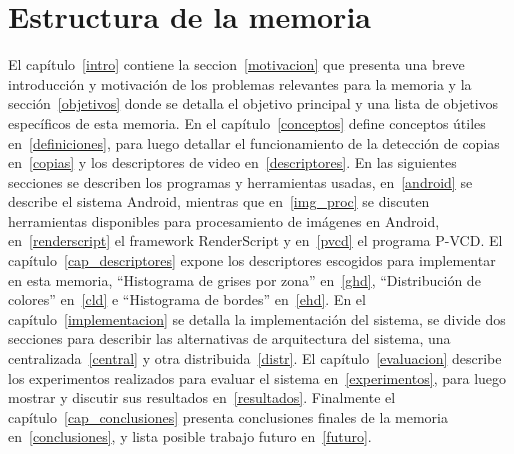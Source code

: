 \section{Estructura de la memoria}
El capítulo~\ref{intro} contiene la seccion~\ref{motivacion} que presenta una breve introducción y motivación de los problemas relevantes para la memoria y la sección~\ref{objetivos} donde se detalla el objetivo principal y una lista de objetivos específicos de esta memoria. En el capítulo~\ref{conceptos} define conceptos útiles en~\ref{definiciones}, para luego detallar el funcionamiento de la detección de copias en~\ref{copias} y los descriptores de video en~\ref{descriptores}. En las siguientes secciones se describen los programas y herramientas usadas, en~\ref{android} se describe el sistema Android, mientras que en~\ref{img_proc} se discuten herramientas disponibles para procesamiento de imágenes en Android, en~\ref{renderscript} el framework RenderScript y en~\ref{pvcd} el programa P-VCD.
El capítulo~\ref{cap_descriptores} expone los descriptores escogidos para implementar en esta memoria, ``Histograma de grises por zona'' en~\ref{ghd}, ``Distribución de colores'' en~\ref{cld} e ``Histograma de bordes'' en~\ref{ehd}.
En el capítulo~\ref{implementacion} se detalla la implementación del sistema, se divide dos secciones para describir las alternativas de arquitectura del sistema, una centralizada~\ref{central} y otra distribuida~\ref{distr}.
El capítulo~\ref{evaluacion} describe los experimentos realizados para evaluar el sistema en~\ref{experimentos}, para luego mostrar y discutir sus resultados en~\ref{resultados}.
Finalmente el capítulo~\ref{cap_conclusiones} presenta conclusiones finales de la memoria en~\ref{conclusiones}, y lista posible trabajo futuro en~\ref{futuro}.

